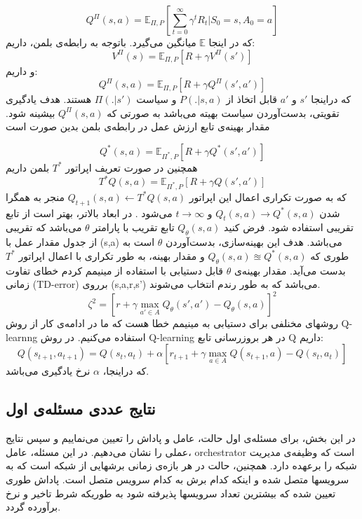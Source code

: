  \begin{equation}
	Q^{\Pi}(s,a) = \mathbb{E}_{\Pi,P}[\sum_{t=0}^{\infty}\gamma^tR_t|S_0=s,A_0=a]
\end{equation}
  که در اینجا 
  $\mathbb{E}$
  میانگین می‌گیرد.
  باتوجه به رابطه‌ی بلمن، داریم:
 \begin{equation}
	V^{\Pi}(s) = \mathbb{E}_{\Pi,P}[R+\gamma V^{\Pi}(s')]
\end{equation}  
  و داریم:
   \begin{equation}
  	Q^{\Pi}(s,a) = \mathbb{E}_{\Pi,P}[R+\gamma Q^{\Pi}(s',a')]
  \end{equation}  
که دراینجا $s'$
و $a'$
قابل اتخاذ از 
$P(.|s,a)$
و سیاست
$\Pi(.|s')$
هستند.
هدف یادگیری تقویتی، بدست‌آوردن سیاست بهیته می‌باشد به صورتی که 
$Q^{\Pi}(s,a)$
بیشینه شود.
مقدار بهینه‌ی تابع ارزش عمل در رابطه‌ی بلمن بدین صورت است

\begin{equation}
	Q^{*}(s,a) = \mathbb{E}_{\Pi^*,P}[R+\gamma Q^{*}(s',a')]
\end{equation} 
همچنین در صورت تعریف اپراتور $T^*$ بلمن داریم
\begin{equation}
	T^{*}Q(s,a) = \mathbb{E}_{\Pi^*,P}[R+\gamma Q(s',a')]
\end{equation} 
که به صورت تکراری اعمال این اپراتور 
$Q_{t+1}(s,a) \leftarrow T^{*}Q(s,a) $
منجر به همگرا شدن 
$Q_{t}(s,a) \rightarrow Q^*(s,a)$
 و
 $t \rightarrow \infty $
می‌شود
\cite{montague1999reinforcement,gan1}.
در ابعاد بالاتر، بهتر است از تابع تقریبی استفاده
شود. فرض کنید 
$Q_{\theta}(s,a)$
تابع تقریب با پارامتر $\theta$
می‌باشد که تقریبی از جدول مقدار عمل با (s,a)
می‌باشد. هدف این بهینه‌سازی، بدست‌آوردن $\theta$
است به طوری که 
$Q_{\theta}(s,a) \approxeq Q^{*}(s,a)$
و مقدار بهینه، به طور تکراری با اعمال اپراتور $T^*$
بدست می‌آید. 
مقدار بهینه‌ی 
$\theta$
قابل دستیابی با استفاده از مینیمم کردم خطای تفاوت زمانی (TD-error)
برروی (s,a,r,s') می‌باشد که به طور رندم انتخاب می‌شوند.
\begin{equation}
\zeta^2 = [r + \gamma \max_{a' \in A}{Q_{\theta}(s',a')}-Q_{\theta}(s,a)]^2
\end{equation}
روشهای مخنلفی برای دستیابی به مینیمم خطا هست که ما در ادامه‌ی کار از روش Q-learnng استفاده می‌کنیم.
در روش Q-learning در هر بروزرسانی تابع Q داریم:
\begin{equation}
	Q(s_{t+1},a_{t+1}) = Q(s_t,a_t)+\alpha[ r_{t+1} + \gamma \max_{a \in A}{Q(s_{t+1},a)}-Q(s_t,a_t)]
\end{equation}
که دراینجا، $\alpha$
نرخ یادگیری می‌باشد.
\subsection{نتایج عددی مسئله‌ی اول}
در این بخش، برای مسئله‌ی اول حالت، عامل و پاداش را تعیین می‌نماییم و سپس نتایج عملی را نشان می‌دهیم.
در این مسئله، عامل، orchestrator است که وظیفه‌ی مدیریت شبکه را برعهده دارد.
همچنین، حالت در هر بازه‌ی زمانی برشهایی از شبکه است که به سرویسها متصل شده و اینکه کدام برش به کدام سرویس متصل است.
پاداش طوری تعیین شده که بیشترین تعداد سرویسها پذیرفته شود به طوریکه شرط تاخیر و نرخ برآورده گردد.

